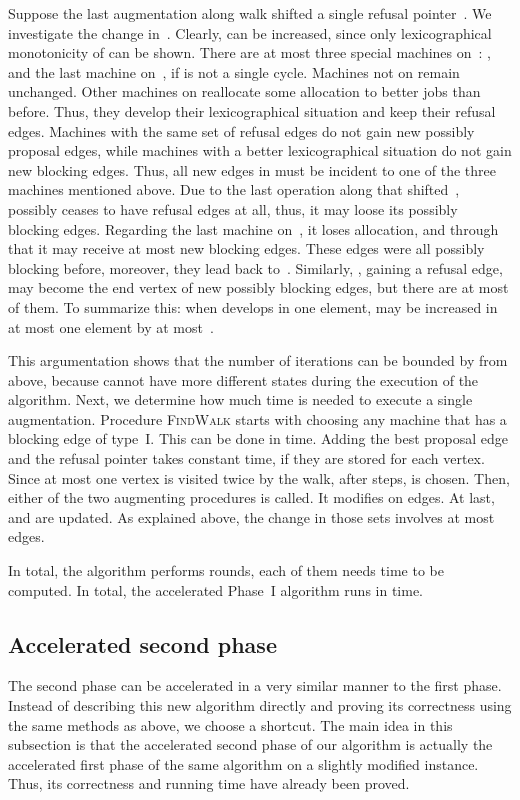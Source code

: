 \documentclass{llncs}
\begin{document}
Suppose the last augmentation along walk  shifted a single refusal pointer~. We investigate the change in~. Clearly,  can be increased, since only lexicographical monotonicity of  can be shown. There are at most three special machines on~: ,  and the last machine on~, if  is not a single cycle. Machines not on  remain unchanged. Other machines on  reallocate some allocation to better jobs than before. Thus, they develop their lexicographical situation and keep their refusal edges. Machines with the same set of refusal edges do not gain new possibly proposal edges, while machines with a better lexicographical situation do not gain new blocking edges. Thus, all new edges in  must be incident to one of the three machines mentioned above. Due to the last operation along  that shifted~,  possibly ceases to have refusal edges at all, thus, it may loose its possibly blocking edges. Regarding the last machine on~, it loses allocation, and through that it may receive at most  new blocking edges. These edges were all possibly blocking before, moreover, they lead back to~. Similarly, , gaining a refusal edge, may become the end vertex of new possibly blocking edges, but there are at most  of them. To summarize this: when  develops in one element,  may be increased in at most one element by at most~.

This argumentation shows that the number of iterations can be bounded by  from above, because  cannot have more different states during the execution of the algorithm. Next, we determine how much time is needed to execute a single augmentation. Procedure \textsc{FindWalk} starts with choosing any machine that has a blocking edge of type~I. This can be done in  time. Adding the best proposal edge and the refusal pointer takes constant time, if they are stored for each vertex. Since at most one vertex is visited twice by the walk, after  steps,  is chosen. Then, either of the two augmenting procedures is called. It modifies  on  edges. At last,  and  are updated. As explained above, the change in those sets involves at most  edges.

In total, the algorithm performs  rounds, each of them needs  time to be computed. In total, the accelerated Phase~I algorithm runs in  time.

\subsection*{Accelerated second phase}

The second phase can be accelerated in a very similar manner to the first phase. Instead of describing this new algorithm directly and proving its correctness using the same methods as above, we choose a shortcut. The main idea in this subsection is that the accelerated second phase of our algorithm is actually the accelerated first phase of the same algorithm on a slightly modified instance. Thus, its correctness and running time have already been proved.
\end{document}
